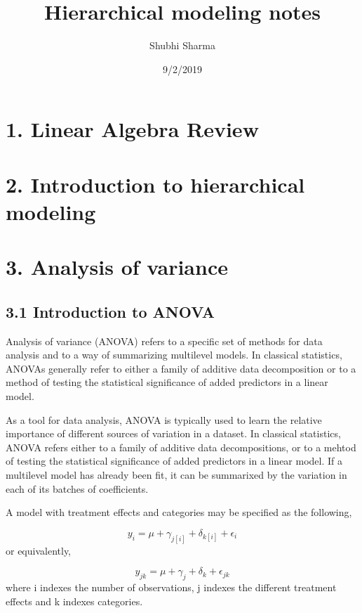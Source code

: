 \documentclass[12pt,]{article}
\title{Hierarchical modeling notes}
\author{Shubhi Sharma}
\date{9/2/2019}
\begin{document}
\maketitle

{
\setcounter{tocdepth}{3}
\tableofcontents
}
\section{1. Linear Algebra Review}\label{linear-algebra-review}

\section{2. Introduction to hierarchical
modeling}\label{introduction-to-hierarchical-modeling}

\section{3. Analysis of variance}\label{analysis-of-variance}

\subsection{3.1 Introduction to ANOVA}\label{introduction-to-anova}

Analysis of variance (ANOVA) refers to a specific set of methods for
data analysis and to a way of summarizing multilevel models. In
classical statistics, ANOVAs generally refer to either a family of
additive data decomposition or to a method of testing the statistical
significance of added predictors in a linear model.

As a tool for data analysis, ANOVA is typically used to learn the
relative importance of different sources of variation in a dataset. In
classical statistics, ANOVA refers either to a family of additive data
decompositions, or to a mehtod of testing the statistical significance
of added predictors in a linear model. If a multilevel model has already
been fit, it can be summarixed by the variation in each of its batches
of coefficients.

A model with treatment effects and categories may be specified as the
following,

\[y_i =  \mu + \gamma_{j[i]} + \delta_{k[i]} + \epsilon_i\] or
equivalently,

\[y_{jk} = \mu + \gamma_j + \delta_k + \epsilon_{jk}\] where i indexes
the number of observations, j indexes the different treatment effects
and k indexes categories.
\end{document}
